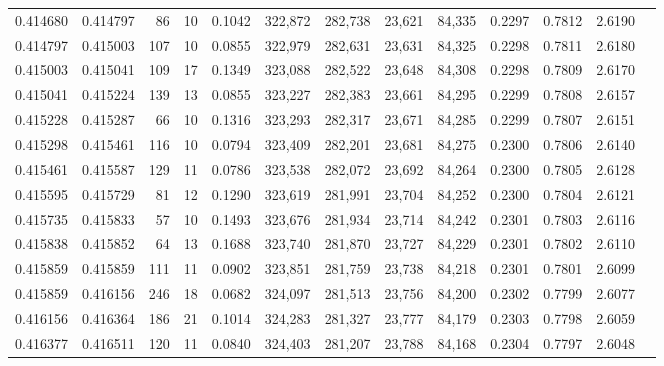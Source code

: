 \begin{tabular}{rrrrrrrrrrrrr}
0.414680 & 0.414797 &    86 &  10 &                                     0.1042 & 322,872 & 282,738 &  23,621 &  84,335 & 0.2297 & 0.7812 & 2.6190 \\
0.414797 & 0.415003 &   107 &  10 &                                     0.0855 & 322,979 & 282,631 &  23,631 &  84,325 & 0.2298 & 0.7811 & 2.6180 \\
0.415003 & 0.415041 &   109 &  17 &                                     0.1349 & 323,088 & 282,522 &  23,648 &  84,308 & 0.2298 & 0.7809 & 2.6170 \\
0.415041 & 0.415224 &   139 &  13 &                                     0.0855 & 323,227 & 282,383 &  23,661 &  84,295 & 0.2299 & 0.7808 & 2.6157 \\
0.415228 & 0.415287 &    66 &  10 &                                     0.1316 & 323,293 & 282,317 &  23,671 &  84,285 & 0.2299 & 0.7807 & 2.6151 \\
0.415298 & 0.415461 &   116 &  10 &                                     0.0794 & 323,409 & 282,201 &  23,681 &  84,275 & 0.2300 & 0.7806 & 2.6140 \\
0.415461 & 0.415587 &   129 &  11 &                                     0.0786 & 323,538 & 282,072 &  23,692 &  84,264 & 0.2300 & 0.7805 & 2.6128 \\
0.415595 & 0.415729 &    81 &  12 &                                     0.1290 & 323,619 & 281,991 &  23,704 &  84,252 & 0.2300 & 0.7804 & 2.6121 \\
0.415735 & 0.415833 &    57 &  10 &                                     0.1493 & 323,676 & 281,934 &  23,714 &  84,242 & 0.2301 & 0.7803 & 2.6116 \\
0.415838 & 0.415852 &    64 &  13 &                                     0.1688 & 323,740 & 281,870 &  23,727 &  84,229 & 0.2301 & 0.7802 & 2.6110 \\
0.415859 & 0.415859 &   111 &  11 &                                     0.0902 & 323,851 & 281,759 &  23,738 &  84,218 & 0.2301 & 0.7801 & 2.6099 \\
0.415859 & 0.416156 &   246 &  18 &                                     0.0682 & 324,097 & 281,513 &  23,756 &  84,200 & 0.2302 & 0.7799 & 2.6077 \\
0.416156 & 0.416364 &   186 &  21 &                                     0.1014 & 324,283 & 281,327 &  23,777 &  84,179 & 0.2303 & 0.7798 & 2.6059 \\
0.416377 & 0.416511 &   120 &  11 &                                     0.0840 & 324,403 & 281,207 &  23,788 &  84,168 & 0.2304 & 0.7797 & 2.6048 \\

\end{tabular}
